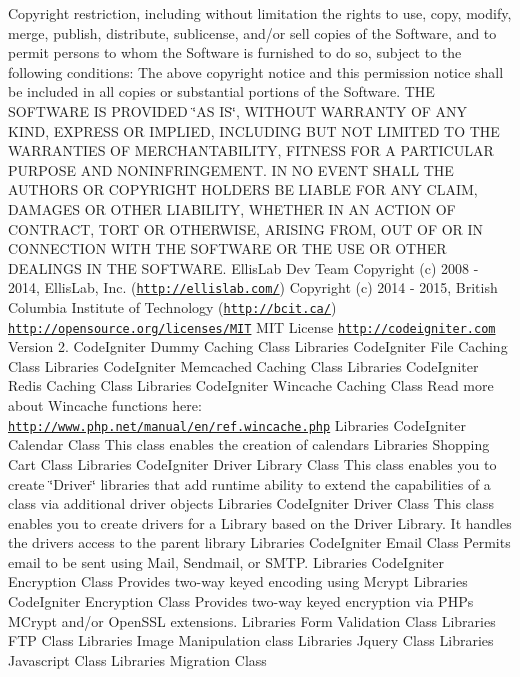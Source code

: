 \begin{DoxyCopyright}{Copyright}
restriction, including without limitation the rights to use, copy, modify, merge, publish, distribute, sublicense, and/or sell copies of the Software, and to permit persons to whom the Software is furnished to do so, subject to the following conditions\+: The above copyright notice and this permission notice shall be included in all copies or substantial portions of the Software. T\+H\+E S\+O\+F\+T\+W\+A\+R\+E I\+S P\+R\+O\+V\+I\+D\+E\+D \char`\"{}\+A\+S I\+S\char`\"{}, W\+I\+T\+H\+O\+U\+T W\+A\+R\+R\+A\+N\+T\+Y O\+F A\+N\+Y K\+I\+N\+D, E\+X\+P\+R\+E\+S\+S O\+R I\+M\+P\+L\+I\+E\+D, I\+N\+C\+L\+U\+D\+I\+N\+G B\+U\+T N\+O\+T L\+I\+M\+I\+T\+E\+D T\+O T\+H\+E W\+A\+R\+R\+A\+N\+T\+I\+E\+S O\+F M\+E\+R\+C\+H\+A\+N\+T\+A\+B\+I\+L\+I\+T\+Y, F\+I\+T\+N\+E\+S\+S F\+O\+R A P\+A\+R\+T\+I\+C\+U\+L\+A\+R P\+U\+R\+P\+O\+S\+E A\+N\+D N\+O\+N\+I\+N\+F\+R\+I\+N\+G\+E\+M\+E\+N\+T. I\+N N\+O E\+V\+E\+N\+T S\+H\+A\+L\+L T\+H\+E A\+U\+T\+H\+O\+R\+S O\+R C\+O\+P\+Y\+R\+I\+G\+H\+T H\+O\+L\+D\+E\+R\+S B\+E L\+I\+A\+B\+L\+E F\+O\+R A\+N\+Y C\+L\+A\+I\+M, D\+A\+M\+A\+G\+E\+S O\+R O\+T\+H\+E\+R L\+I\+A\+B\+I\+L\+I\+T\+Y, W\+H\+E\+T\+H\+E\+R I\+N A\+N A\+C\+T\+I\+O\+N O\+F C\+O\+N\+T\+R\+A\+C\+T, T\+O\+R\+T O\+R O\+T\+H\+E\+R\+W\+I\+S\+E, A\+R\+I\+S\+I\+N\+G F\+R\+O\+M, O\+U\+T O\+F O\+R I\+N C\+O\+N\+N\+E\+C\+T\+I\+O\+N W\+I\+T\+H T\+H\+E S\+O\+F\+T\+W\+A\+R\+E O\+R T\+H\+E U\+S\+E O\+R O\+T\+H\+E\+R D\+E\+A\+L\+I\+N\+G\+S I\+N T\+H\+E S\+O\+F\+T\+W\+A\+R\+E.  Ellis\+Lab Dev Team  Copyright (c) 2008 -\/ 2014, Ellis\+Lab, Inc. (\href{http://ellislab.com/}{\tt http\+://ellislab.\+com/})  Copyright (c) 2014 -\/ 2015, British Columbia Institute of Technology (\href{http://bcit.ca/}{\tt http\+://bcit.\+ca/})  \href{http://opensource.org/licenses/MIT}{\tt http\+://opensource.\+org/licenses/\+M\+I\+T} M\+I\+T License  \href{http://codeigniter.com}{\tt http\+://codeigniter.\+com}  Version 2.  Code\+Igniter Dummy Caching Class  Libraries Code\+Igniter File Caching Class  Libraries Code\+Igniter Memcached Caching Class  Libraries Code\+Igniter Redis Caching Class  Libraries Code\+Igniter Wincache Caching Class Read more about Wincache functions here\+: \href{http://www.php.net/manual/en/ref.wincache.php}{\tt http\+://www.\+php.\+net/manual/en/ref.\+wincache.\+php}  Libraries Code\+Igniter Calendar Class This class enables the creation of calendars  Libraries Shopping Cart Class  Libraries Code\+Igniter Driver Library Class This class enables you to create \char`\"{}\+Driver\char`\"{} libraries that add runtime ability to extend the capabilities of a class via additional driver objects  Libraries Code\+Igniter Driver Class This class enables you to create drivers for a Library based on the Driver Library. It handles the drivers\textquotesingle{} access to the parent library  Libraries Code\+Igniter Email Class Permits email to be sent using Mail, Sendmail, or S\+M\+T\+P.  Libraries Code\+Igniter Encryption Class Provides two-\/way keyed encoding using Mcrypt  Libraries Code\+Igniter Encryption Class Provides two-\/way keyed encryption via P\+H\+P\textquotesingle{}s M\+Crypt and/or Open\+S\+S\+L extensions.  Libraries Form Validation Class  Libraries F\+T\+P Class  Libraries Image Manipulation class  Libraries Jquery Class  Libraries Javascript Class  Libraries Migration Class 
\end{DoxyCopyright}
